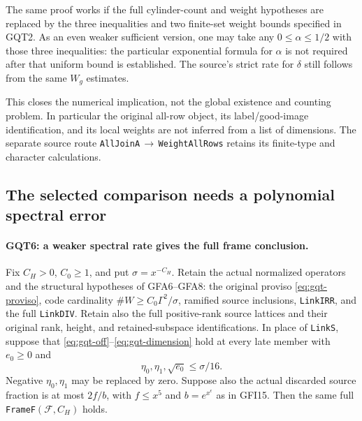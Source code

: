 \documentclass[11pt,a4paper]{article}
\numberwithin{equation}{section}
\theoremstyle{remark}\newtheorem{remark}[theorem]{Remark}
\begin{document}
The same proof works if the full cylinder-count and weight hypotheses
are replaced by the three inequalities and two finite-set weight
bounds specified in GQT2. As an even weaker sufficient version, one
may take any $0\le\alpha\le1/2$ with those three inequalities:
the particular exponential formula for $\alpha$ is not required
after that uniform bound is established. The source's strict rate
for $\delta$ still follows from the same $W_g$ estimates.

This closes the numerical implication, not the global existence
and counting problem. In particular the original all-row object,
its label/good-image identification, and its local weights are
not inferred from a list of dimensions. The separate source route
\texttt{All\allowbreak Join\allowbreak A}\,$\to$\,\texttt{Weight\allowbreak All\allowbreak Rows} retains its
finite-type and character calculations.

\subsection{The selected comparison needs a polynomial spectral error}

\paragraph{GQT6: a weaker spectral rate gives the full frame conclusion.}
\label{claim:GQT6}
Fix $C_H>0$, $C_0\ge1$, and put $\sigma=x^{-C_H}$. Retain the actual normalized
operators and the structural hypotheses of GFA6--GFA8: the original
proviso \eqref{eq:gqt-proviso}, code cardinality
$\#W\ge C_0\Gamma^2/\sigma$, ramified source inclusions,
\texttt{Link\allowbreak IRR}, and the full \texttt{Link\allowbreak DIV}. Retain also the
full positive-rank source lattices and their original rank, height,
and retained-subspace identifications. In place of
\texttt{Link\allowbreak S}, suppose that
\eqref{eq:gqt-off}--\eqref{eq:gqt-dimension} hold at every late
member with $e_0\ge0$ and
\begin{equation}\label{eq:gqt-poly}
       \eta_0,\eta_1,\sqrt{e_0}\le\sigma/16.
\end{equation}
Negative $\eta_0,\eta_1$ may be replaced by zero. Suppose also
the actual discarded source fraction is at most $2f/b$, with
$f\le x^5$ and $b=e^{x^\epsilon}$ as in GFI15.
Then the same full \texttt{Frame\allowbreak F}$(\mathcal F,\allowbreak{} C_H)$ holds.
\end{document}
